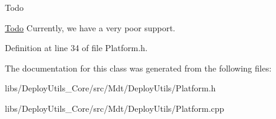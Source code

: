 \begin{DoxyRefDesc}{Todo}
\item[\hyperlink{todo__todo000005}{Todo}]Currently, we have a very poor support. \end{DoxyRefDesc}


Definition at line 34 of file Platform.\+h.



The documentation for this class was generated from the following files\+:\begin{DoxyCompactItemize}
\item 
libs/\+Deploy\+Utils\+\_\+\+Core/src/\+Mdt/\+Deploy\+Utils/Platform.\+h\item 
libs/\+Deploy\+Utils\+\_\+\+Core/src/\+Mdt/\+Deploy\+Utils/Platform.\+cpp\end{DoxyCompactItemize}
